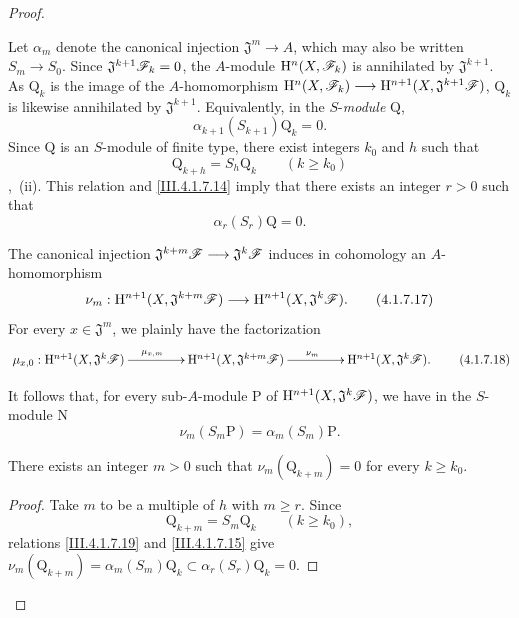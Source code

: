\begin{proof}
\begin{env}[4.1.7.13]
\label{III.4.1.7.13}
Let $\alpha_m$ denote the canonical injection $\mathfrak{J}^m\longrightarrow A$,
which may also be written $S_m\to S_0$.
Since $\mathfrak{J}^{k+1}\mathscr{F}_k=0$, the $A$-module
$\mathrm{H}^n(X,\mathscr{F}_k)$ is annihilated by $\mathfrak{J}^{k+1}$.
As $\mathrm{Q}_k$ is the image of the $A$-homomorphism $\mathrm{H}^n(X,\mathscr{F}_k)
\longrightarrow
\mathrm{H}^{n+1}(X,\mathfrak{J}^{k+1}\mathscr{F})$,
$\mathrm{Q}_k$ is likewise annihilated by $\mathfrak{J}^{k+1}$.
Equivalently, in the $S$-\emph{module} $\mathrm{Q}$,
\[
  \alpha_{k+1}(S_{k+1})\mathrm{Q}_k=0.
  \tag{4.1.7.14}
  \label{III.4.1.7.14}
\]
Since $\mathrm{Q}$ is an $S$-module of finite type, there exist
integers $k_0$ and $h$ such that
\[
  \mathrm{Q}_{k+h}=S_h\mathrm{Q}_k
  \qquad(k\geq k_0)
\]
,~(ii).
This relation and \eqref{III.4.1.7.14} imply that there exists an
integer $r>0$ such that
\[
  \alpha_r(S_r)\mathrm{Q}=0.
  \tag{4.1.7.15}
  \label{III.4.1.7.15}
\]
\end{env}

\begin{env}[4.1.7.16]
\label{III.4.1.7.16}
The canonical injection $\mathfrak{J}^{k+m}\mathscr{F}
\longrightarrow
\mathfrak{J}^k\mathscr{F}$
induces in cohomology an $A$-homomorphism
\[
  \nu_m:
  \mathrm{H}^{n+1}(X,\mathfrak{J}^{k+m}\mathscr{F})
  \longrightarrow
  \mathrm{H}^{n+1}(X,\mathfrak{J}^k\mathscr{F}).
  \tag{4.1.7.17}
  \label{III.4.1.7.17}
\]
For every $x\in\mathfrak{J}^m$, we plainly have the factorization
\[
  \xymatrix@C=4.5em{
    \mu_{x,0}:\HH^{n+1}(X,\mathfrak{J}^k\sh{F})
      \ar[r]^{\mu_{x,m}}
    &
    \HH^{n+1}(X,\mathfrak{J}^{k+m}\sh{F})
      \ar[r]^{\nu_m}
    &
    \HH^{n+1}(X,\mathfrak{J}^k\sh{F}).
  }
  \tag{4.1.7.18}
  \label{III.4.1.7.18}
\]
\end{env}


It follows that, for every sub-$A$-module $\mathrm{P}$ of
$\mathrm{H}^{n+1}(X,\mathfrak{J}^k\mathscr{F})$, we have in the $S$-module
$\mathrm{N}$
\[
  \nu_m(S_m\mathrm{P})
  =
  \alpha_m(S_m)\mathrm{P}.
  \tag{4.1.7.19}
  \label{III.4.1.7.19}
\]

\begin{lemma}[4.1.7.20]
\label{III.4.1.7.20}
There exists an integer $m>0$ such that $\nu_m(\mathrm{Q}_{k+m})=0$
for every $k\geq k_0$.
\end{lemma}

\begin{proof}
Take $m$ to be a multiple of $h$ with $m\geq r$.
Since
\[
  \mathrm{Q}_{k+m}=S_m\mathrm{Q}_k
  \qquad(k\geq k_0),
\]
relations \eqref{III.4.1.7.19} and \eqref{III.4.1.7.15} give $\nu_m(\mathrm{Q}_{k+m})
=
\alpha_m(S_m)\mathrm{Q}_k
\subset
\alpha_r(S_r)\mathrm{Q}_k
=
0$.
\end{proof}


\end{proof}
